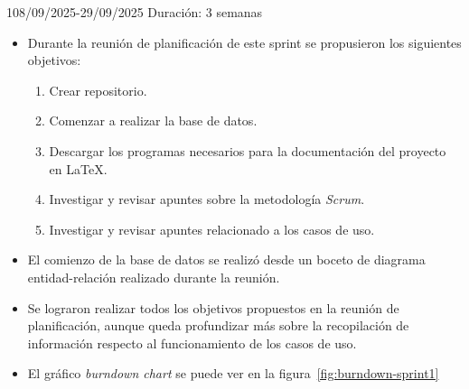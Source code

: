 \begin{Sprint}{1}{08/09/2025-29/09/2025}
Duración: 3 semanas

\begin{itemize}
	\item{}
	Durante la reunión de planificación de este sprint se propusieron los siguientes objetivos:
	\begin{enumerate}
		\item Crear repositorio.
		\item Comenzar a realizar la base de datos.
		\item Descargar los programas necesarios para la documentación del proyecto en \LaTeX{}.
		\item Investigar y revisar apuntes sobre la metodología \textit{Scrum}.
		\item Investigar y revisar apuntes relacionado a los casos de uso.
	\end{enumerate}
	\item{}
	El comienzo de la base de datos se realizó desde un boceto de diagrama entidad-relación realizado durante la reunión.
	\item{}
	Se lograron realizar todos los objetivos propuestos en la reunión de planificación, aunque queda profundizar más sobre la recopilación de información respecto al funcionamiento de los casos de uso.
	\item{}
	El gráfico \textit{burndown chart} se puede ver en la figura~\ref{fig:burndown-sprint1}
\end{itemize}


\end{Sprint}

